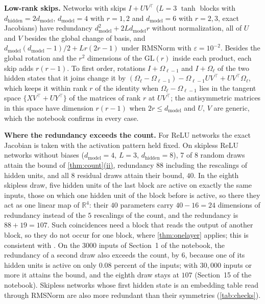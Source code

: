 \documentclass[10pt]{article}
\theoremstyle{definition}
\theoremstyle{remark}
\newcommand{\R}{\mathbb{R}}
\newcommand{\dm}{d_{\mathrm{model}}}
\newcommand{\dhid}{d_{\mathrm{hidden}}}
\newcommand{\GL}{\mathrm{GL}}
\newcommand{\para}[1]{\smallskip\noindent\textbf{#1}\hspace{0.5em}}
\DeclareRobustCommand{\cpref}[2]{\hyperref[#1:#2]{\cref*{#1}(#2)}}
\begin{document}
\para{Low-rank skips.} Networks with skips $I + UV^\top$ ($L = 3$ $\tanh$ blocks with $\dhid = 2\dm$, $\dm = 4$ with $r = 1, 2$ and $\dm = 6$ with $r = 2, 3$, exact Jacobians) have redundancy $\dm^2 + 2L\dm r$ without normalization, all of $U$ and $V$ besides the global change of basis, and $\dm(\dm-1)/2 + Lr(2r-1)$ under RMSNorm with $\varepsilon = 10^{-2}$. Besides the global rotation and the $r^2$ dimensions of the $\GL(r)$ inside each product, each skip adds $r(r-1)$. To first order, rotations $I + \Omega_{\ell-1}$ and $I + \Omega_\ell$ of the two hidden states that it joins change it by $(\Omega_\ell - \Omega_{\ell-1}) - \Omega_{\ell-1}UV^\top + UV^\top\Omega_\ell$, which keeps it within rank $r$ of the identity when $\Omega_\ell - \Omega_{\ell-1}$ lies in the tangent space $\{XV^\top + UY^\top\}$ of the matrices of rank $r$ at $UV^\top$; the antisymmetric matrices in this space have dimension $r(r-1)$ when $2r \le \dm$ and $U$, $V$ are generic, which the notebook confirms in every case.

\para{Where the redundancy exceeds the count.} For ReLU networks the exact Jacobian is taken with the activation pattern held fixed. On skipless ReLU networks without biases ($\dm = 4$, $L = 3$, $\dhid = 8$), 7 of 8 random draws attain the bound of \cpref{thm:count}{ii}, redundancy $88$ including the rescalings of hidden units, and all 8 residual draws attain their bound, $40$. In the eighth skipless draw, five hidden units of the last block are active on exactly the same inputs, those on which one hidden unit of the block before is active, so there they act as one linear map of $\R^4$: their $40$ parameters carry $40 - 16 = 24$ dimensions of redundancy instead of the $5$ rescalings of the count, and the redundancy is $88 + 19 = 107$. Such coincidences need a block that reads the output of another block, so they do not occur for one block, where \cref{thm:onelayer} applies; this is consistent with \citet{grigsby2023hidden}. On the 3000 inputs of Section~1 of the notebook, the redundancy of a second draw also exceeds the count, by 6, because one of its hidden units is active on only $0.08$ percent of the inputs; with $30{,}000$ inputs or more it attains the bound, and the eighth draw stays at $107$ (Section~15 of the notebook). Skipless networks whose first hidden state is an embedding table read through RMSNorm are also more redundant than their symmetries (\cref{tab:checks}).
\end{document}
